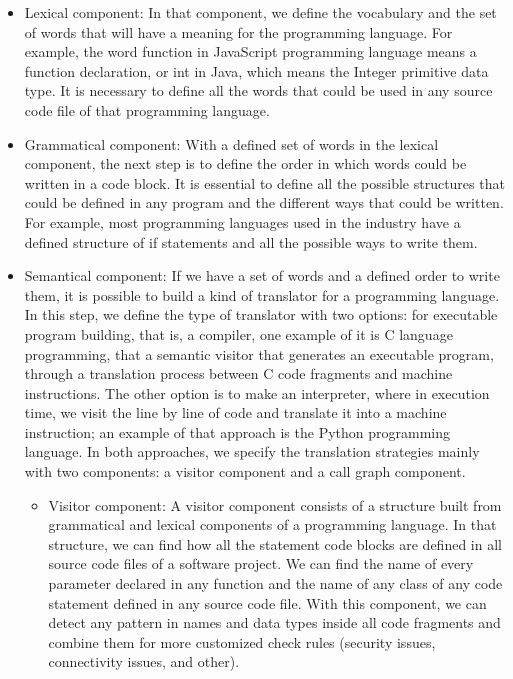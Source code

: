 \begin{itemize}
	\item Lexical component: In that component, we define the vocabulary and the set of words that will have a meaning for the programming language. For example, the word function in JavaScript programming language means a function declaration, or int in Java, which means the Integer primitive data type. It is necessary to define all the words that could be used in any source code file of that programming language.
	\item Grammatical component: With a defined set of words in the lexical component, the next step is to define the order in which words could be written in a code block. It is essential to define all the possible structures that could be defined in any program and the different ways that could be written. For example, most programming languages used in the industry have a defined structure of if statements and all the possible ways to write them.
	\item Semantical component: If we have a set of words and a defined order to write them, it is possible to build a kind of translator for a programming language. In this step, we define the type of translator with two options: for executable program building, that is, a compiler, one example of it is C language programming, that a semantic visitor that generates an executable program, through a translation process between C code fragments and machine instructions. The other option is to make an interpreter, where in execution time, we visit the line by line of code and translate it into a machine instruction; an example of that approach is the Python programming language. In both approaches, we specify the translation strategies mainly with two components: a visitor component and a call graph component.
		\begin{itemize}
			\item Visitor component: A visitor component consists of a structure built from grammatical and lexical components of a programming language. In that structure, we can find how all the statement code blocks are defined in all source code files of a software project. We can find the name of every parameter declared in any function and the name of any class of any code statement defined in any source code file. With this component, we can detect any pattern in names and data types inside all code fragments and combine them for more customized check rules (security issues, connectivity issues, and other).		
			\begin{figure}

\end{figure}
\end{itemize}
\end{itemize}
